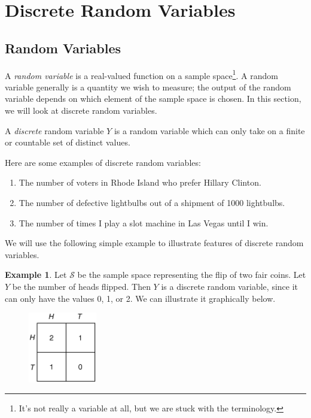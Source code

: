 \documentclass[12pt]{article}
\theoremstyle{definition}
\newtheorem*{example}{Example}
\theoremstyle{remark}
\def\cals{{\mathcal S}}
\begin{document}
\setcounter{section}{1}
\section{Discrete Random Variables}

\subsection{Random Variables}
A \emph{random variable} is a real-valued function on a sample space\footnote{It's not really a variable at all, but we are stuck with the terminology.}. A random variable generally is a quantity we wish to measure; the output of the random variable depends on which element of the sample space is chosen. In this section, we will look at discrete random variables.

\begin{framed}
A \emph{discrete} random variable $Y$ is a random variable which can only take on a finite or countable set of distinct values.
\end{framed}

Here are some examples of discrete random variables:
\begin{enumerate}
\item The number of voters in Rhode Island who prefer Hillary Clinton.
\item The number of defective lightbulbs out of a shipment of 1000 lightbulbs.
\item The number of times I play a slot machine in Las Vegas until I win.
\end{enumerate}

We will use the following simple example to illustrate features of discrete random variables.

\begin{example}Let $\cals$ be the sample space representing the flip of two fair coins. Let $Y$ be the number of heads flipped. Then $Y$ is a discrete random variable, since it can only have the values 0, 1, or 2. We can illustrate it graphically below.
\begin{figure}[H]
\centering
\includegraphics[width=3cm]{numberofheads.eps}
\end{figure}
\end{example}
\end{document}
